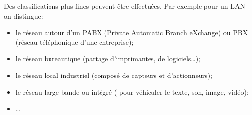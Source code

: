 Des classifications plus fines peuvent être effectuées. Par exemple pour un LAN on distingue:
\begin{itemize}
	\item le réseau autour d'un PABX (Private Automatic Branch eXchange) ou PBX (réseau téléphonique d'une entreprise);
	\item le réseau bureautique (partage d'imprimantes, de logiciels\ldots);
	\item le réseau local industriel (composé de capteurs et d'actionneurs);
	\item le réseau large bande ou intégré ( pour véhiculer le texte, son, image, vidéo);
	\item \ldots
\end{itemize}

